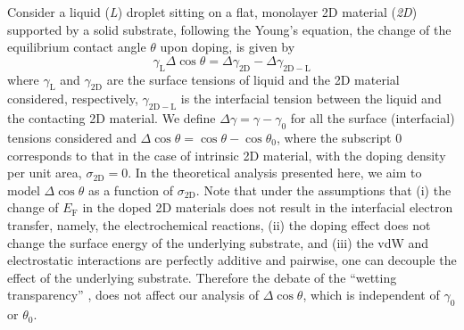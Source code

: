 \documentclass[journal=langd5,manuscript=article,email=true,hyperref=true,keywords=true]{achemso}
\begin{document}
Consider a liquid (\emph{L}) droplet sitting on a flat, monolayer 2D
material (\emph{2D}) supported by a solid substrate, following the Young’s
equation, the change of the equilibrium contact angle \(\theta\) upon
doping, is given by
\begin{equation}
\label{eqn-def-Young-Delta-theta}
\gamma_{\mathrm{L}} \Delta \cos\theta = \Delta \gamma_{\mathrm{2D}}
                                 - \Delta \gamma_{\mathrm{2D-L}}
\end{equation}
where \(\gamma_{\mathrm{L}}\) and \(\gamma_{\mathrm{2D}}\) are the surface
tensions of liquid and the 2D material considered, respectively,
\(\gamma_{\mathrm{2D-L}}\) is the interfacial tension between the liquid
and the contacting 2D material. We define \(\Delta \gamma = \gamma -
\gamma_{0}\) for all the surface (interfacial) tensions considered and
\(\Delta \cos \theta = \cos \theta - \cos \theta_{0}\), where the
subscript 0 corresponds to that in the case of intrinsic 2D material,
with the doping density per unit area, \(\sigma_{\mathrm{2D}} = 0\). In
the theoretical analysis presented here, we aim to model \(\Delta \cos
\theta\) as a function of \(\sigma_{\mathrm{2D}}\). Note that under the
assumptions that (i) the change of \(E_{\mathrm{F}}\) in the doped 2D
materials does not result in the interfacial electron transfer,
namely, the electrochemical reactions, (ii) the doping effect does not
change the surface energy of the underlying substrate, and (iii) the
vdW and electrostatic interactions are perfectly additive and
pairwise, one can decouple the effect of the underlying
substrate. Therefore the debate of the “wetting transparency”
\cite{rafiee_wetting_2012,shih_wetting_2013}, does not affect our
analysis of \(\Delta \cos \theta\), which is independent of \(\gamma_{0}\)
or \(\theta_{0}\).
\end{document}
